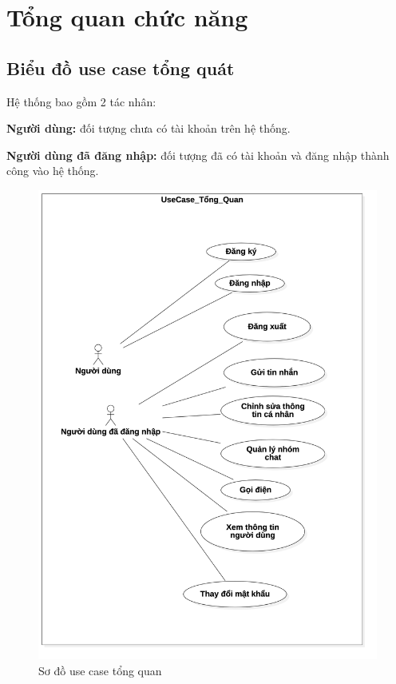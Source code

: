 \documentclass[../DoAn.tex]{subfiles}
\begin{document}
\section{Tổng quan chức năng}
\label{section:2.2}

\subsection{Biểu đồ use case tổng quát}
\label{subsection:2.2.1}
Hệ thống bao gồm 2 tác nhân:

\textbf{Người dùng:} đối tượng chưa có tài khoản trên hệ thống.

\textbf{Người dùng đã đăng nhập:} đối tượng đã có tài khoản và đăng nhập thành công vào hệ thống.

\begin{figure}[H]
    \centering
    \includegraphics[width=0.9\linewidth]{Hinhve/UseCase/UseCase_Tong_Quan.png}
    \caption{Sơ đồ use case tổng quan}
    \label{fig:use_case_tổng_quan}
\end{figure}
\newpage
\end{document}
